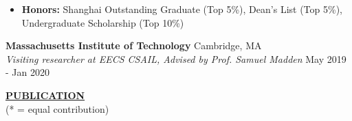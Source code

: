 \documentclass{article}
\begin{document}
\begin{itemize}
\vspace{-0.6em}
  \item \textbf{Honors:} Shanghai Outstanding Graduate (Top 5\%), Dean's List (Top 5\%), Undergraduate Scholarship (Top 10\%) %
\vspace{-0.6em}
\end{itemize}
\large \textbf{Massachusetts Institute of Technology} \hfill  \normalsize Cambridge, MA \\
\textit{Visiting researcher at EECS CSAIL, Advised by Prof. Samuel Madden}  \hfill May 2019 - Jan 2020



\noindent \textbf{\underline{PUBLICATION}} \\
\vspace{-2.8em}
(* = equal contribution) \\
\end{document}
